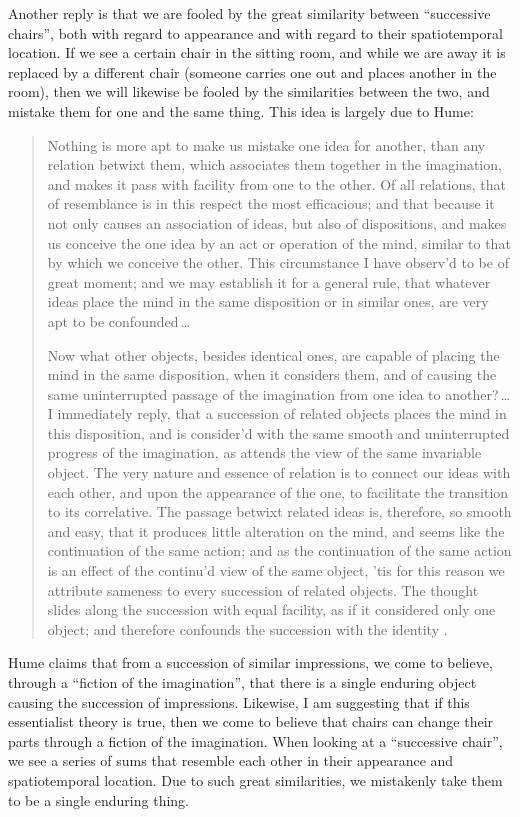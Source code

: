 \documentclass[12pt,twoside]{reedfancy}
\begin{document}
\begin{spacing}{1.25}
Another reply is that we are fooled by the great similarity between
``successive chairs'', both with regard to appearance and with regard
to their spatiotemporal location.  If we see a certain chair in the
sitting room, and while we are away it is replaced by a different
chair (someone carries one out and places another in the room), then
we will likewise be fooled by the similarities between the two, and
mistake them for one and the same thing.  This idea is largely due to
Hume:

\begin{quote}
Nothing is more apt to make us mistake one idea for another, than any
relation betwixt them, which associates them together in the
imagination, and makes it pass with facility from one to the other.
Of all relations, that of resemblance is in this respect the most
efficacious; and that because it not only causes an association of
ideas, but also of dispositions, and makes us conceive the one idea by
an act or operation of the mind, similar to that by which we conceive
the other.  This circumstance I have observ'd to be of great moment;
and we may establish it for a general rule, that whatever ideas place
the mind in the same disposition or in similar ones, are very apt to
be confounded\,\ldots

Now what other objects, besides identical ones, are capable of placing
the mind in the same disposition, when it considers them, and of
causing the same uninterrupted passage of the imagination from one
idea to another?\,\ldots I immediately reply, that a succession of
related objects places the mind in this disposition, and is consider'd
with the same smooth and uninterrupted progress of the imagination, as
attends the view of the same invariable object.  The very nature and
essence of relation is to connect our ideas with each other, and upon
the appearance of the one, to facilitate the transition to its
correlative.  The passage betwixt related ideas is, therefore, so
smooth and easy, that it produces little alteration on the mind, and
seems like the continuation of the same action; and as the
continuation of the same action is an effect of the continu'd view of
the same object, 'tis for this reason we attribute sameness to every
succession of related objects.  The thought slides along the
succession with equal facility, as if it considered only one object;
and therefore confounds the succession with the identity
\citep[135]{hume2000}.
\end{quote}

Hume claims that from a succession of similar impressions, we come to
believe, through a ``fiction of the imagination'', that there is a
single enduring object causing the succession of impressions.
Likewise, I am suggesting that if this essentialist theory is true,
then we come to believe that chairs can change their parts through a
fiction of the imagination.  When looking at a ``successive chair'',
we see a series of sums that resemble each other in their appearance
and spatiotemporal location.  Due to such great similarities, we
mistakenly take them to be a single enduring thing.


\end{spacing}
\end{document}
